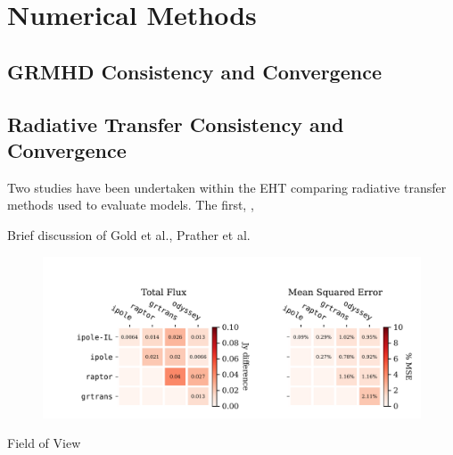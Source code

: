 \section{Numerical Methods}\label{app:numerical}

\subsection{GRMHD Consistency and Convergence}\label{app:resolution_study}





\subsection{Radiative Transfer Consistency and Convergence}
\label{app:radtrans}


Two studies have been undertaken within the EHT comparing radiative transfer methods used to evaluate models.  The first, \cite{2020ApJ...897..148G}, 

Brief discussion of Gold et al., Prather et al.

\begin{figure}
  \centering
  \includegraphics{figures/grmhd_hi_IntegratedUnpolarizeds_plot.pdf}
  \caption{}
  \label{fig:radtrans_grmhd_comp}
\end{figure}

Field of View

